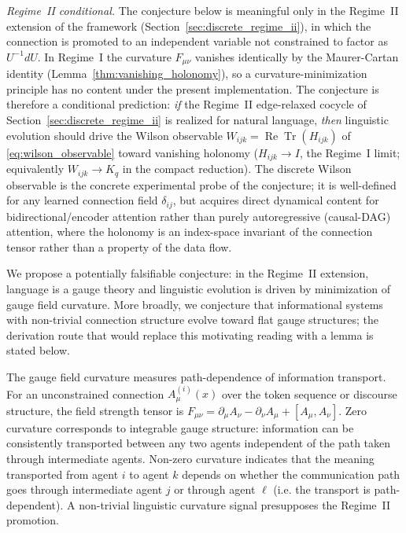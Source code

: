 \documentclass[11pt]{article}
\begin{document}
\emph{Regime~II conditional.} The conjecture below is meaningful only in the Regime~II extension of the framework (Section~\ref{sec:discrete_regime_ii}), in which the connection is promoted to an independent variable not constrained to factor as $U^{-1}dU$. In Regime~I the curvature $F_{\mu\nu}$ vanishes identically by the Maurer-Cartan identity (Lemma~\ref{thm:vanishing_holonomy}), so a curvature-minimization principle has no content under the present implementation. The conjecture is therefore a conditional prediction: \emph{if} the Regime~II edge-relaxed cocycle of Section~\ref{sec:discrete_regime_ii} is realized for natural language, \emph{then} linguistic evolution should drive the Wilson observable $W_{ijk} = \operatorname{Re}\operatorname{Tr}(H_{ijk})$ of \eqref{eq:wilson_observable} toward vanishing holonomy ($H_{ijk} \to I$, the Regime~I limit; equivalently $W_{ijk} \to K_q$ in the compact reduction). The discrete Wilson observable is the concrete experimental probe of the conjecture; it is well-defined for any learned connection field $\delta_{ij}$, but acquires direct dynamical content for bidirectional/encoder attention rather than purely autoregressive (causal-DAG) attention, where the holonomy is an index-space invariant of the connection tensor rather than a property of the data flow.

We propose a potentially falsifiable conjecture: in the Regime~II extension, language is a gauge theory and linguistic evolution is driven by minimization of gauge field curvature. More broadly, we conjecture that informational systems with non-trivial connection structure evolve toward flat gauge structures; the derivation route that would replace this motivating reading with a lemma is stated below.

The gauge field curvature measures path-dependence of information transport. For an unconstrained connection $A_\mu^{(i)}(x)$ over the token sequence or discourse structure, the field strength tensor is $F_{\mu\nu} = \partial_\mu A_\nu - \partial_\nu A_\mu + [A_\mu, A_\nu]$. Zero curvature corresponds to integrable gauge structure: information can be consistently transported between any two agents independent of the path taken through intermediate agents. Non-zero curvature indicates that the meaning transported from agent $i$ to agent $k$ depends on whether the communication path goes through intermediate agent $j$ or through agent $\ell$ (i.e. the transport is path-dependent). A non-trivial linguistic curvature signal presupposes the Regime~II promotion.
\end{document}

